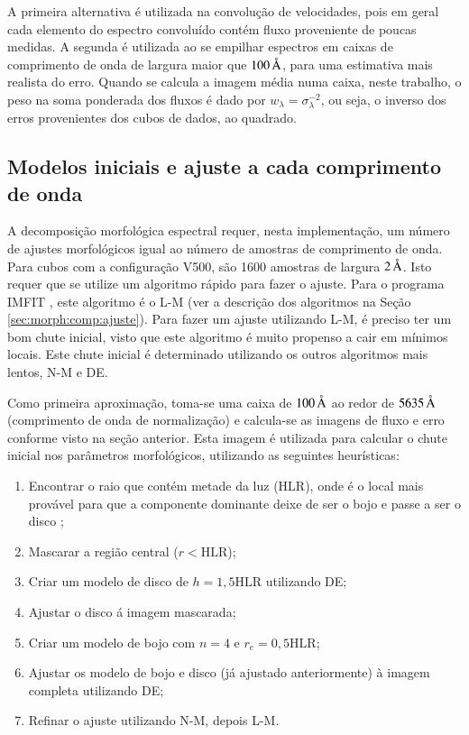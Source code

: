 A primeira alternativa é utilizada na convolução de velocidades, pois em geral
cada elemento do espectro convoluído contém fluxo proveniente de poucas medidas.
A segunda é utilizada ao se empilhar espectros em caixas de comprimento de onda
de largura maior que $100\,\text{\normalfont\AA}$, para uma estimativa mais realista do
erro. Quando se calcula a imagem média numa caixa, neste trabalho, o peso na
soma ponderada dos fluxos é dado por $w_\lambda = \sigma_\lambda^{-2}$, ou seja,
o inverso dos erros provenientes dos cubos de dados, ao quadrado.


\subsection{Modelos iniciais e ajuste a cada comprimento de onda}
\label{sec:Decomp:initmodel}

A decomposição morfológica espectral requer, nesta implementação, um número de
ajustes morfológicos igual ao número de amostras de comprimento de onda. Para
cubos com a configuração V500, são 1600 amostras de largura $2\,\text{\normalfont\AA}$. Isto
requer que se utilize um algoritmo rápido para fazer o ajuste. Para o programa
IMFIT \citep{Erwin2015}, este algoritmo é o L-M (ver a descrição dos algoritmos
na Seção \ref{sec:morph:comp:ajuste}). Para fazer um ajuste utilizando L-M, é
preciso ter um bom chute inicial, visto que este algoritmo é muito propenso a
cair em mínimos locais. Este chute inicial é determinado utilizando os outros
algoritmos mais lentos, N-M e DE.

Como primeira aproximação, toma-se uma caixa de $100\,\text{\normalfont\AA}$ ao redor de
$5635\,\text{\normalfont\AA}$ (comprimento de onda de normalização) e calcula-se as imagens
de fluxo e erro conforme visto na seção anterior. Esta imagem é utilizada para
calcular o chute inicial nos parâmetros morfológicos, utilizando as seguintes
heurísticas:
\begin{enumerate}
  \item Encontrar o raio que contém metade da luz ($\mathrm{HLR}$), onde
  é o local mais provável para que a componente dominante deixe de ser o
  bojo e passe a ser o disco \cite{GonzalezDelgado2015};
  \item Mascarar a região central ($r < \mathrm{HLR}$);
  \item Criar um modelo de disco de $h=1,5 \mathrm{HLR}$ utilizando DE;
  \item Ajustar o disco á imagem mascarada;
  \item Criar um modelo de bojo com $n = 4$ e $r_e = 0,5 \mathrm{HLR}$;
  \item Ajustar os modelo de bojo e disco (já ajustado anteriormente) à imagem
  completa utilizando DE;
  \item Refinar o ajuste utilizando N-M, depois L-M.
\end{enumerate}

